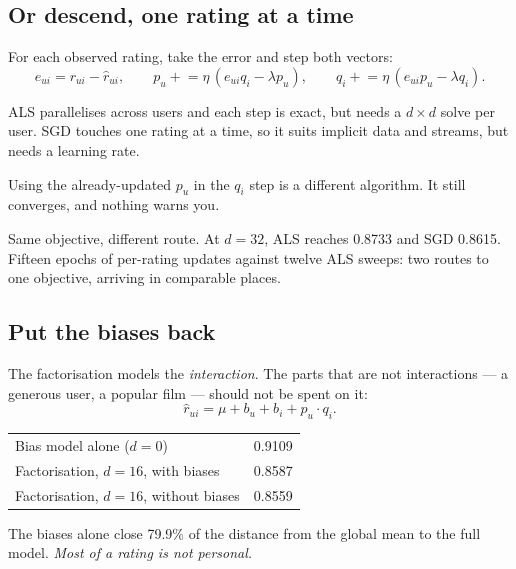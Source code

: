 \documentclass[11pt,a4paper]{article}
\begin{document}
\subsection{Or descend, one rating at a time}

For each observed rating, take the error and step both vectors:
\[
  e_{ui} = r_{ui} - \hat r_{ui}, \qquad
  p_u \mathrel{+}= \eta\,(e_{ui}q_i - \lambda p_u), \qquad
  q_i \mathrel{+}= \eta\,(e_{ui}p_u - \lambda q_i).
\]

ALS parallelises across users and each step is exact, but needs a $d\times d$
solve per user. SGD touches one rating at a time, so it suits implicit data and
streams, but needs a learning rate.

\begin{failbox}[title={Failure condition --- an update that quietly changes the algorithm}]
Using the already-updated $p_u$ in the $q_i$ step is a different algorithm. It
still converges, and nothing warns you.
\end{failbox}

Same objective, different route. At $d = 32$, ALS reaches 0.8733 and SGD
0.8615. Fifteen epochs of per-rating updates against twelve ALS sweeps: two
routes to one objective, arriving in comparable places.

\subsection{Put the biases back}

The factorisation models the \emph{interaction}. The parts that are not
interactions --- a generous user, a popular film --- should not be spent on it:
\[ \hat r_{ui} = \mu + b_u + b_i + p_u\cdot q_i . \]

\begin{center}
\small
\begin{tabular}{lr}
\toprule
Bias model alone ($d = 0$)                & 0.9109 \\
Factorisation, $d = 16$, with biases      & 0.8587 \\
Factorisation, $d = 16$, without biases   & 0.8559 \\
\bottomrule
\end{tabular}
\end{center}

The biases alone close 79.9\% of the distance from the global mean to the full
model. \emph{Most of a rating is not personal.}
\end{document}
